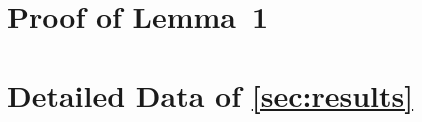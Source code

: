 \appendix

\chapter{Proof of Lemma~1}\label{ch:appendix1}

\chapter{Detailed Data of \cref{sec:results}}\label{ch:appendix2}